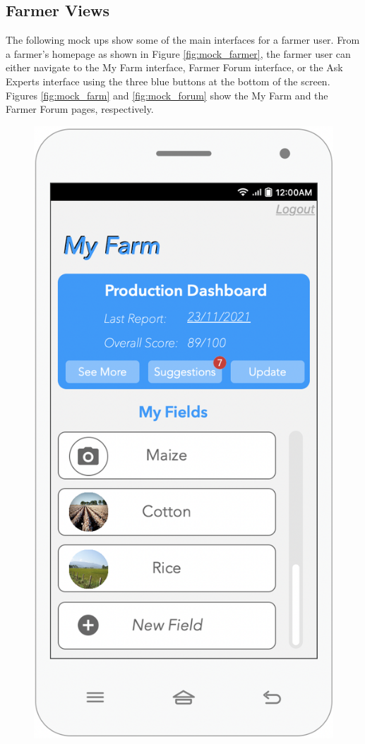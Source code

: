 \newpage
\subsection{Farmer Views}
\noindent
The following mock ups show some of the main interfaces for a farmer user. From a farmer's homepage as shown in Figure \ref{fig:mock_farmer}, the farmer user can either navigate to the My Farm interface, Farmer Forum interface, or the Ask Experts interface using the three blue buttons at the bottom of the screen. Figures \ref{fig:mock_farm} and \ref{fig:mock_forum} show the My Farm and the Farmer Forum pages, respectively. 

\begin{multicols}{2}
\begin{figure}[H]
\centering
\includegraphics[scale=0.5]{../images_diagrams/mock_ups/myfarm100.png}

\end{figure}
\end{multicols}
